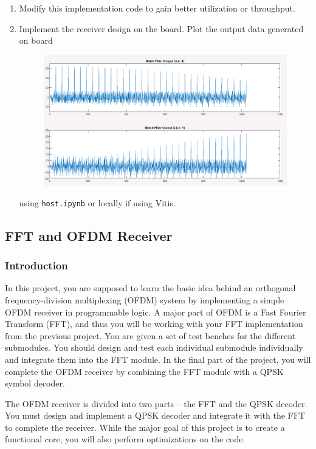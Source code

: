 \documentclass[a4paper,12pt,twoside]{article}
\begin{document}
\begin{enumerate}
    \item Modify this implementation code to gain better utilization or throughput.
    \item Implement the receiver design on the board. Plot the output data generated on board
    \begin{figure}[H]
        \centering
        \includegraphics[width=\textwidth]{images/8.png}
    \end{figure}
    using \texttt{host.ipynb} or locally if using Vitis.
\end{enumerate}

\subsection{FFT and OFDM Receiver}
\subsubsection{Introduction}
In this project, you are supposed to learn the basic idea behind an orthogonal frequency-division multiplexing (OFDM) system by implementing a simple OFDM receiver in programmable logic. A major part of OFDM is a Fast Fourier Transform (FFT), and thus you will be working with your FFT implementation from the previous project. You are given a set of test benches for the different submodules. You should design and test each individual submodule individually and integrate them into the FFT module. In the final part of the project, you will complete the OFDM receiver by combining the FFT module with a QPSK symbol decoder.

The OFDM receiver is divided into two parts – the FFT and the QPSK decoder. You must design and implement a QPSK decoder and integrate it with the FFT to complete the receiver. While the major goal of this project is to create a functional core, you will also perform optimizations on the code.
\end{document}
